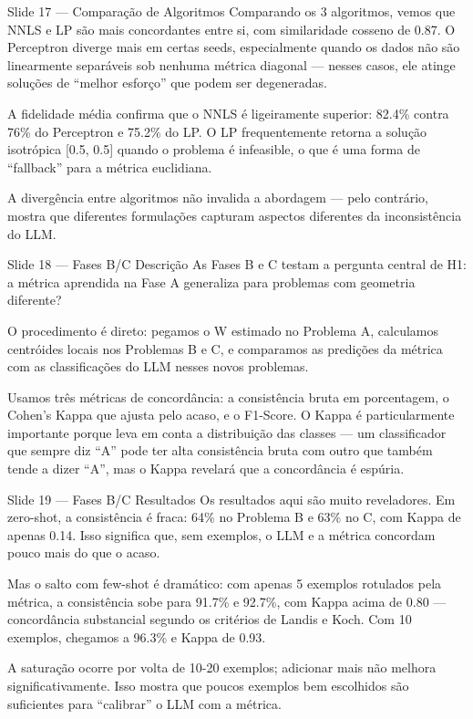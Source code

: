 \documentclass[aspectratio=169,11pt]{beamer}
\begin{document}
\begin{frame}{Slide 17 --- Comparação de Algoritmos}
\small
Comparando os 3 algoritmos, vemos que NNLS e LP são mais concordantes entre si, com similaridade cosseno de 0.87. O Perceptron diverge mais em certas seeds, especialmente quando os dados não são linearmente separáveis sob nenhuma métrica diagonal --- nesses casos, ele atinge soluções de ``melhor esforço'' que podem ser degeneradas.

A fidelidade média confirma que o NNLS é ligeiramente superior: 82.4\% contra 76\% do Perceptron e 75.2\% do LP. O LP frequentemente retorna a solução isotrópica [0.5, 0.5] quando o problema é infeasible, o que é uma forma de ``fallback'' para a métrica euclidiana.

A divergência entre algoritmos não invalida a abordagem --- pelo contrário, mostra que diferentes formulações capturam aspectos diferentes da inconsistência do LLM.
\end{frame}

\begin{frame}{Slide 18 --- Fases B/C Descrição}
\small
As Fases B e C testam a pergunta central de H1: a métrica aprendida na Fase A generaliza para problemas com geometria diferente?

O procedimento é direto: pegamos o W estimado no Problema A, calculamos centróides locais nos Problemas B e C, e comparamos as predições da métrica com as classificações do LLM nesses novos problemas.

Usamos três métricas de concordância: a consistência bruta em porcentagem, o Cohen's Kappa que ajusta pelo acaso, e o F1-Score. O Kappa é particularmente importante porque leva em conta a distribuição das classes --- um classificador que sempre diz ``A'' pode ter alta consistência bruta com outro que também tende a dizer ``A'', mas o Kappa revelará que a concordância é espúria.
\end{frame}

\begin{frame}{Slide 19 --- Fases B/C Resultados}
\small
Os resultados aqui são muito reveladores. Em zero-shot, a consistência é fraca: 64\% no Problema B e 63\% no C, com Kappa de apenas 0.14. Isso significa que, sem exemplos, o LLM e a métrica concordam pouco mais do que o acaso.

Mas o salto com few-shot é dramático: com apenas 5 exemplos rotulados pela métrica, a consistência sobe para 91.7\% e 92.7\%, com Kappa acima de 0.80 --- concordância substancial segundo os critérios de Landis e Koch. Com 10 exemplos, chegamos a 96.3\% e Kappa de 0.93.

A saturação ocorre por volta de 10-20 exemplos; adicionar mais não melhora significativamente. Isso mostra que poucos exemplos bem escolhidos são suficientes para ``calibrar'' o LLM com a métrica.
\end{frame}
\end{document}
